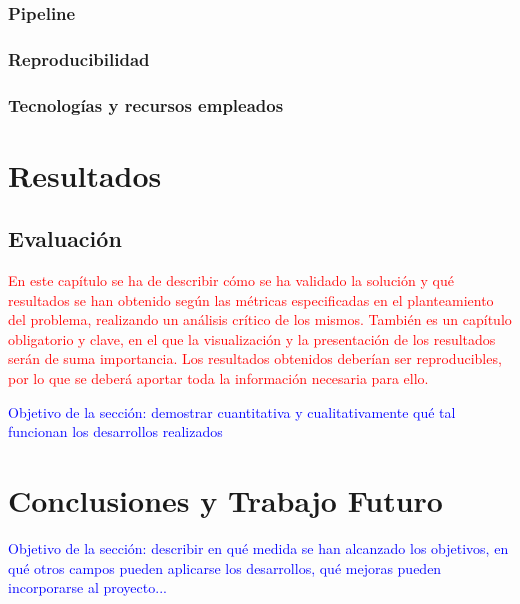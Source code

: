 \documentclass[12pt]{extarticle}
\numberwithin{equation}{section}
\begin{document}
\begin{refsection}
\subsubsection{Pipeline}
\label{subsubsec:pipeline}

\subsubsection{Reproducibilidad}
\label{subsubsec:reproducibilidad}

\subsubsection{Tecnologías y recursos empleados}
\label{subsubsec:tecnologiasyrecursos}


\newpage

\section{Resultados}\label{sec:results}

\subsection{Evaluación}
\label{subsec:evaluacion}

\textcolor{red}{En este capítulo se ha de describir cómo se ha validado la solución y qué resultados se han obtenido según las métricas especificadas en el planteamiento del problema, realizando un análisis crítico de los mismos. También es un capítulo obligatorio y clave, en el que la visualización y la presentación de los resultados serán de suma importancia.
Los resultados obtenidos deberían ser reproducibles, por lo que se deberá aportar toda la información necesaria para ello.
}

\textcolor{blue}{Objetivo de la secci\'on: demostrar cuantitativa y cualitativamente qu\'e tal funcionan los desarrollos realizados}

\newpage

\section{Conclusiones y Trabajo Futuro}\label{sec:conclusion}
\textcolor{blue}{Objetivo de la secci\'on: describir en qu\'e medida se han alcanzado los objetivos, en qu\'e otros campos pueden aplicarse los desarrollos, qu\'e mejoras pueden incorporarse al proyecto...}


\end{refsection}
\end{document}
